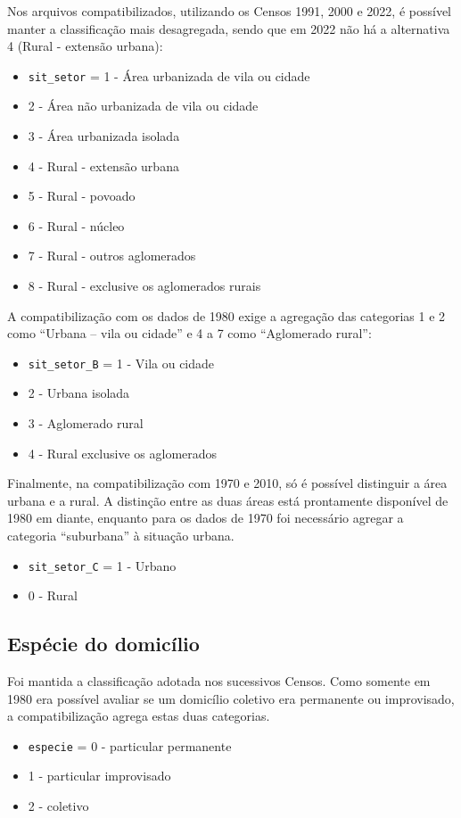 \documentclass[12pt,a4paper]{article}
\newcommand{\vr}[1]{\texttt{#1}}
\begin{document}
Nos arquivos compatibilizados, utilizando os Censos 1991, 2000 e 2022, é possível manter a classificação mais desagregada, sendo que em 2022 não há a alternativa 4 (Rural - extensão urbana):
\begin{itemize}
  \item \vr{sit\_setor} = 1 - Área urbanizada de vila ou cidade
  \item 2 - Área não urbanizada de vila ou cidade
  \item 3 - Área urbanizada isolada
  \item 4 - Rural - extensão urbana
  \item 5 - Rural - povoado
  \item 6 - Rural - núcleo
  \item 7 - Rural - outros aglomerados
  \item 8 - Rural - exclusive os aglomerados rurais
\end{itemize}

A compatibilização com os dados de 1980 exige a agregação das categorias 1 e 2 como “Urbana -- vila ou cidade” e 4 a 7 como “Aglomerado rural”:
\begin{itemize}
  \item \vr{sit\_setor\_B} = 1 - Vila ou cidade
  \item 2 - Urbana isolada
  \item 3 - Aglomerado rural
  \item 4 - Rural exclusive os aglomerados
\end{itemize}

Finalmente, na compatibilização com 1970 e 2010, só é possível distinguir a área urbana e a rural. A distinção entre as duas áreas está prontamente disponível de 1980 em diante, enquanto para os dados de 1970 foi necessário agregar a categoria “suburbana” à situação urbana.
\begin{itemize}
  \item \vr{sit\_setor\_C} = 1 - Urbano
  \item 0 - Rural
\end{itemize}

\subsection{Espécie do domicílio}\label{sec:c2}
Foi mantida a classificação adotada nos sucessivos Censos. Como somente em 1980 era possível avaliar se um domicílio coletivo era permanente ou improvisado, a compatibilização agrega estas duas categorias.
\begin{itemize}
  \item \vr{especie} = 0 - particular permanente
  \item 1 - particular improvisado
  \item 2 - coletivo
\end{itemize}
\end{document}
